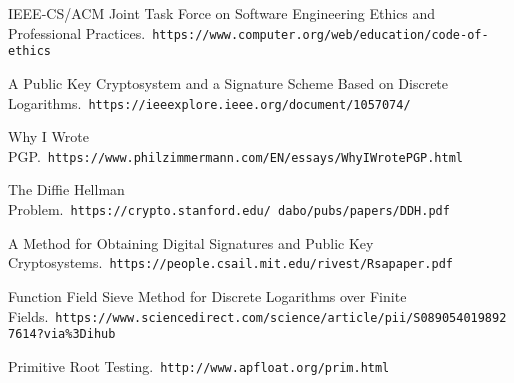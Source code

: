 \documentclass[12pt]{report}
\begin{document}
\newpage

\begin{thebibliography}{9}

    IEEE-CS/ACM Joint Task Force on Software Engineering Ethics and Professional Practices.\
    \texttt{https://www.computer.org/web/education/code-of-ethics}
    
    A Public Key Cryptosystem and a Signature Scheme Based on Discrete Logarithms.\
    \texttt{https://ieeexplore.ieee.org/document/1057074/}
    
    Why I Wrote PGP.\
    \texttt{https://www.philzimmermann.com/EN/essays/WhyIWrotePGP.html}
    
    \bibitem{stanford}
    The Diffie Hellman Problem.\
    \texttt{https://crypto.stanford.edu/~dabo/pubs/papers/DDH.pdf}
    
    \bibitem{mit}
    A Method for Obtaining Digital Signatures and Public Key Cryptosystems.\
    \texttt{https://people.csail.mit.edu/rivest/Rsapaper.pdf}

    Function Field Sieve Method for Discrete Logarithms over Finite Fields.\
    \texttt{https://www.sciencedirect.com/science/article/pii/S0890540198927614?via\%3Dihub}

    \bibitem{root}
    Primitive Root Testing.\
    \texttt{http://www.apfloat.org/prim.html}

\end{thebibliography}
\end{document}
